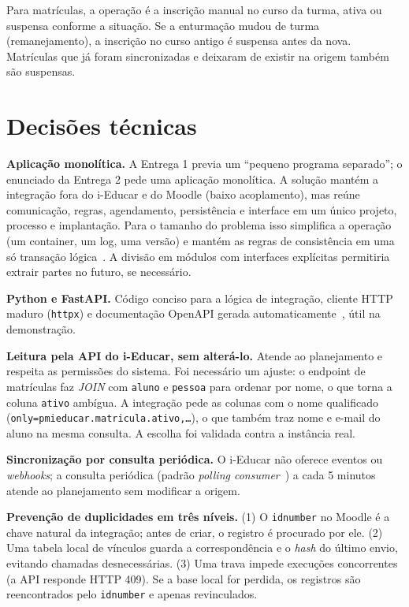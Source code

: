 \documentclass[12pt]{article}
\newcommand{\cod}[1]{\texttt{#1}}
\begin{document}
Para matrículas, a operação é a inscrição manual no curso da turma, ativa ou
suspensa conforme a situação. Se a enturmação mudou de turma (remanejamento),
a inscrição no curso antigo é suspensa antes da nova. Matrículas que já foram
sincronizadas e deixaram de existir na origem também são suspensas.

\section{Decisões técnicas}
\label{sec:decisoes}

\textbf{Aplicação monolítica.} A Entrega 1 previa um ``pequeno programa
separado''; o enunciado da Entrega 2 pede uma aplicação monolítica. A solução
mantém a integração fora do i-Educar e do Moodle (baixo acoplamento), mas
reúne comunicação, regras, agendamento, persistência e interface em um único
projeto, processo e implantação. Para o tamanho do problema isso simplifica a
operação (um container, um log, uma versão) e mantém as regras de consistência
em uma só transação lógica~\cite{richards2020}. A divisão em módulos com
interfaces explícitas permitiria extrair partes no futuro, se necessário.

\textbf{Python e FastAPI.} Código conciso para a lógica de integração,
cliente HTTP maduro (\cod{httpx}) e documentação OpenAPI gerada
automaticamente~\cite{fastapi}, útil na demonstração.

\textbf{Leitura pela API do i-Educar, sem alterá-lo.} Atende ao planejamento
e respeita as permissões do sistema. Foi necessário um ajuste: o endpoint de
matrículas faz \emph{JOIN} com \cod{aluno} e \cod{pessoa} para ordenar por
nome, o que torna a coluna \cod{ativo} ambígua. A integração pede as colunas
com o nome qualificado (\cod{only=pmieducar.matricula.ativo,\ldots}), o que
também traz nome e e-mail do aluno na mesma consulta. A escolha foi validada
contra a instância real.

\textbf{Sincronização por consulta periódica.} O i-Educar não oferece
eventos ou \emph{webhooks}; a consulta periódica (padrão \emph{polling
consumer}~\cite{hohpe2003}) a cada 5 minutos atende ao planejamento sem
modificar a origem.

\textbf{Prevenção de duplicidades em três níveis.} (1) O \cod{idnumber} no
Moodle é a chave natural da integração; antes de criar, o registro é procurado
por ele. (2) Uma tabela local de vínculos guarda a correspondência e o
\emph{hash} do último envio, evitando chamadas desnecessárias. (3) Uma trava
impede execuções concorrentes (a API responde HTTP 409). Se a base local for
perdida, os registros são reencontrados pelo \cod{idnumber} e apenas
revinculados.
\end{document}
